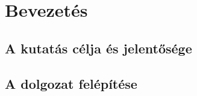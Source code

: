 \chapter{Bevezetés}  %

\section{A kutatás célja és jelentősége}  %

\section{A dolgozat felépítése}  %
